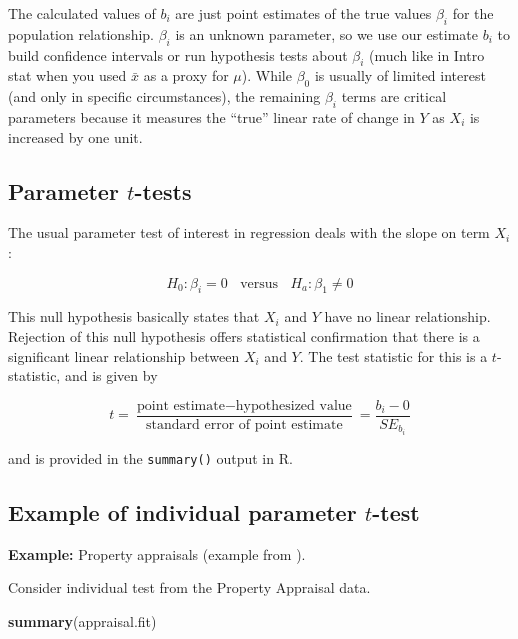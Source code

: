 \documentclass[
]{book}
\newenvironment{Shaded}{\begin{snugshade}}{\end{snugshade}}
\newcommand{\FunctionTok}[1]{\textcolor[rgb]{0.13,0.29,0.53}{\textbf{#1}}}
\newcommand{\NormalTok}[1]{#1}
\begin{document}
The calculated values of \(b_i\) are just point estimates of the true values \(\beta_i\) for the population relationship. \(\beta_i\) is an unknown parameter, so we use our estimate \(b_i\) to build confidence intervals or run hypothesis tests about \(\beta_i\) (much like in Intro stat when you used \(\bar{x}\) as a proxy for \(\mu\)).
While \(\beta_0\) is usually of limited interest (and only in specific circumstances), the remaining \(\beta_i\) terms are critical parameters because it measures the ``true'' linear rate of change in \(Y\) as \(X_i\) is increased by one unit.

\hypertarget{parameter-t-tests}{%
\subsection{\texorpdfstring{Parameter \(t\)-tests}{Parameter t-tests}}\label{parameter-t-tests}}

The usual parameter test of interest in regression deals with the slope on term \(X_i\):

\[H_0: \beta_i = 0~~~~\textrm{versus}~~~~ H_a: \beta_1 \neq 0\]

This null hypothesis basically states that \(X_i\) and \(Y\) have no linear relationship. Rejection of this null hypothesis offers statistical confirmation that there is a significant linear relationship between \(X_i\) and \(Y\). The test statistic for this is a \(t\)-statistic, and is given by

\[t=\frac{\textrm{point estimate}-\textrm{hypothesized value}}{\textrm{standard error of point estimate}} = \frac{b_i - 0}{SE_{b_i}}\]

and is provided in the \texttt{summary()} output in R.

\hypertarget{example-of-individual-parameter-t-test}{%
\subsection{\texorpdfstring{Example of individual parameter \(t\)-test}{Example of individual parameter t-test}}\label{example-of-individual-parameter-t-test}}

\textbf{Example:} Property appraisals (example from \citet{McClaveSincich2008}).

Consider individual test from the Property Appraisal data.

\begin{Shaded}
\begin{Highlighting}[]
\FunctionTok{summary}\NormalTok{(appraisal.fit)}
\end{Highlighting}
\end{Shaded}
\end{document}
